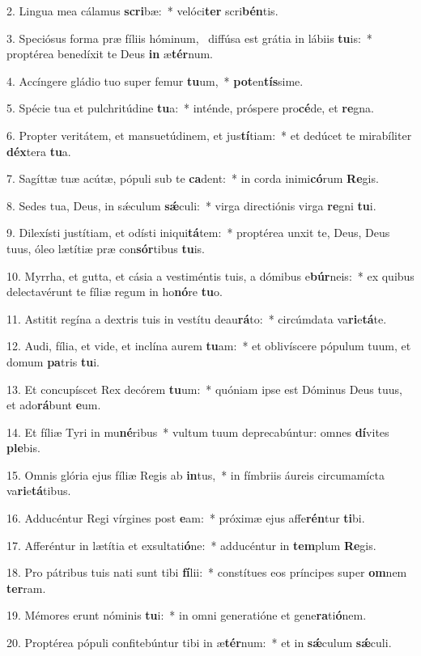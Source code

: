 2. Lingua mea cálamus \textbf{scri}bæ:~*  velóci\textbf{ter} scri\textbf{bén}tis.\

3. Speciósus forma præ fíliis hóminum, \dag\  diffúsa est grátia in lábiis \textbf{tu}is:~*  proptérea benedíxit te Deus \textbf{in} æ\textbf{tér}num.\

4. Accíngere gládio tuo super femur \textbf{tu}um,~*  \textbf{pot}en\textbf{tís}sime.\

5. Spécie tua et pulchritúdine \textbf{tu}a:~*  inténde, próspere pro\textbf{cé}de, et \textbf{re}gna.\

6. Propter veritátem, et mansuetúdinem, et jus\textbf{tí}tiam:~*  et dedúcet te mirabíliter \textbf{déx}tera \textbf{tu}a.\

7. Sagíttæ tuæ acútæ, pópuli sub te \textbf{ca}dent:~*  in corda inimi\textbf{có}rum \textbf{Re}gis.\

8. Sedes tua, Deus, in sǽculum \textbf{sǽ}culi:~*  virga directiónis virga \textbf{re}gni \textbf{tu}i.\

9. Dilexísti justítiam, et odísti iniqui\textbf{tá}tem:~*  proptérea unxit te, Deus, Deus tuus, óleo lætítiæ præ con\textbf{sór}tibus \textbf{tu}is.\

10. Myrrha, et gutta, et cásia a vestiméntis tuis, a dómibus e\textbf{búr}neis:~*  ex quibus delectavérunt te fíliæ regum in ho\textbf{nó}re \textbf{tu}o.\

11. Astitit regína a dextris tuis in vestítu deau\textbf{rá}to:~*  circúmdata va\textbf{ri}e\textbf{tá}te.\

12. Audi, fília, et vide, et inclína aurem \textbf{tu}am:~*  et oblivíscere pópulum tuum, et domum \textbf{pa}tris \textbf{tu}i.\

13. Et concupíscet Rex decórem \textbf{tu}um:~*  quóniam ipse est Dóminus Deus tuus, et ado\textbf{rá}bunt \textbf{e}um.\

14. Et fíliæ Tyri in mu\textbf{né}ribus~*  vultum tuum deprecabúntur: omnes \textbf{dí}vites \textbf{ple}bis.\

15. Omnis glória ejus fíliæ Regis ab \textbf{in}tus,~*  in fímbriis áureis circumamícta va\textbf{ri}e\textbf{tá}tibus.\

16. Adducéntur Regi vírgines post \textbf{e}am:~*  próximæ ejus affe\textbf{rén}tur \textbf{ti}bi.\

17. Afferéntur in lætítia et exsultati\textbf{ó}ne:~*  adducéntur in \textbf{tem}plum \textbf{Re}gis.\

18. Pro pátribus tuis nati sunt tibi \textbf{fí}lii:~*  constítues eos príncipes super \textbf{om}nem \textbf{ter}ram.\

19. Mémores erunt nóminis \textbf{tu}i:~*  in omni generatióne et gene\textbf{ra}ti\textbf{ó}nem.\

20. Proptérea pópuli confitebúntur tibi in æ\textbf{tér}num:~*  et in \textbf{sǽ}culum \textbf{sǽ}culi.\

